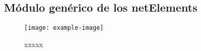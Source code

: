 \subsection{Módulo genérico de los netElements}

\lipsum[1]

\begin{figure}[H]
	\centering
	\texttt{[image: example-image]}
	\centering\caption{xxxxx}
	\label{fig:XXXX}
\end{figure}

\lipsum[1]